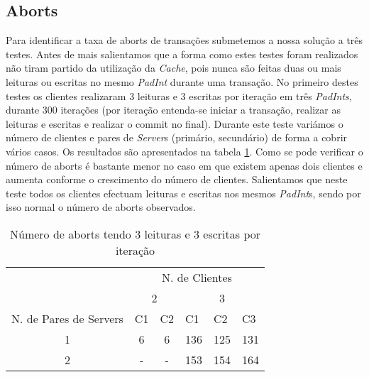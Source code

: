 \subsection{Aborts}
Para identificar a taxa de aborts de transações submetemos a nossa solução a três testes. Antes de mais salientamos que a forma como estes testes foram realizados não tiram partido da utilização da \textit{Cache}, pois nunca são feitas duas ou mais leituras ou escritas no mesmo \textit{PadInt} durante uma transação. No primeiro destes testes os clientes realizaram 3 leituras e 3 escritas por iteração em três \textit{PadInts}, durante 300 iterações (por iteração entenda-se iniciar a transação, realizar as leituras e escritas e realizar o commit no final). Durante este teste variámos o número de clientes e pares de \textit{Server}s (primário, secundário) de forma a cobrir vários casos. Os resultados são apresentados na tabela \ref{figAAborts}. Como se pode verificar o número de aborts é bastante menor no caso em que existem apenas dois clientes e aumenta conforme o crescimento do número de clientes. Salientamos que neste teste todos os clientes efectuam leituras e escritas nos mesmos \textit{PadInt}s, sendo por isso normal o número de aborts observados.

\begin{table}[h]
\centering
\begin{tabular}{l|c|c|c|c|c|}
\cline{2-6}
                                 & \multicolumn{5}{c|}{N. de Clientes}                                                                                                   \\ \cline{2-6} 
                                 & \multicolumn{2}{c|}{2}                            & \multicolumn{3}{c|}{3}                                                      \\ \hline
\multicolumn{1}{|l|}{N. de Pares de Servers} & \multicolumn{1}{l|}{C1} & \multicolumn{1}{l|}{C2} & \multicolumn{1}{l|}{C1} & \multicolumn{1}{l|}{C2} & \multicolumn{1}{l|}{C3} \\ \hline
\multicolumn{1}{|c|}{1}          & 6                       & 6                       & 136                     & 125                     & 131                     \\ \hline
\multicolumn{1}{|c|}{2}          & -                       & -                       & 153                     & 154                     & 164                     \\ \hline
\end{tabular}
\caption{Número de aborts tendo 3 leituras e 3 escritas por iteração} \label{figAAborts}
\end{table}

